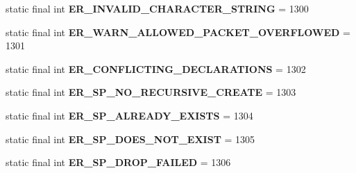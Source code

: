 \begin{DoxyCompactItemize}
\item 
\mbox{\label{classcom_1_1mysql_1_1cj_1_1exceptions_1_1_mysql_error_numbers_a459f135bf80bd2b8e31df4607c2afd17}} 
static final int {\bfseries E\+R\+\_\+\+I\+N\+V\+A\+L\+I\+D\+\_\+\+C\+H\+A\+R\+A\+C\+T\+E\+R\+\_\+\+S\+T\+R\+I\+NG} = 1300
\item 
\mbox{\label{classcom_1_1mysql_1_1cj_1_1exceptions_1_1_mysql_error_numbers_aa1bcd4d8183163759480ce757a17ac78}} 
static final int {\bfseries E\+R\+\_\+\+W\+A\+R\+N\+\_\+\+A\+L\+L\+O\+W\+E\+D\+\_\+\+P\+A\+C\+K\+E\+T\+\_\+\+O\+V\+E\+R\+F\+L\+O\+W\+ED} = 1301
\item 
\mbox{\label{classcom_1_1mysql_1_1cj_1_1exceptions_1_1_mysql_error_numbers_a4c1eaf17e4583baed529e3054de689cb}} 
static final int {\bfseries E\+R\+\_\+\+C\+O\+N\+F\+L\+I\+C\+T\+I\+N\+G\+\_\+\+D\+E\+C\+L\+A\+R\+A\+T\+I\+O\+NS} = 1302
\item 
\mbox{\label{classcom_1_1mysql_1_1cj_1_1exceptions_1_1_mysql_error_numbers_aa7de43f50a466e399b71a913b42a2989}} 
static final int {\bfseries E\+R\+\_\+\+S\+P\+\_\+\+N\+O\+\_\+\+R\+E\+C\+U\+R\+S\+I\+V\+E\+\_\+\+C\+R\+E\+A\+TE} = 1303
\item 
\mbox{\label{classcom_1_1mysql_1_1cj_1_1exceptions_1_1_mysql_error_numbers_af92a204f8196539760f1a7a4ca49ad03}} 
static final int {\bfseries E\+R\+\_\+\+S\+P\+\_\+\+A\+L\+R\+E\+A\+D\+Y\+\_\+\+E\+X\+I\+S\+TS} = 1304
\item 
\mbox{\label{classcom_1_1mysql_1_1cj_1_1exceptions_1_1_mysql_error_numbers_ae1fc210270b37811567aee3bbc21c1a2}} 
static final int {\bfseries E\+R\+\_\+\+S\+P\+\_\+\+D\+O\+E\+S\+\_\+\+N\+O\+T\+\_\+\+E\+X\+I\+ST} = 1305
\item 
\mbox{\label{classcom_1_1mysql_1_1cj_1_1exceptions_1_1_mysql_error_numbers_ac44074af607fe6e2efe82ca1b884b5dd}} 
static final int {\bfseries E\+R\+\_\+\+S\+P\+\_\+\+D\+R\+O\+P\+\_\+\+F\+A\+I\+L\+ED} = 1306

\end{DoxyCompactItemize}
